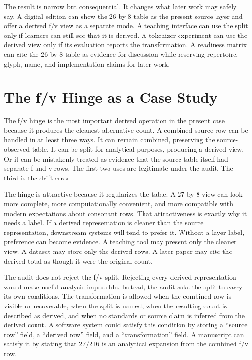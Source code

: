 \documentclass[sigconf,nonacm]{acmart}
\begin{document}
The result is narrow but consequential. It changes what later work may safely
say. A digital edition can show the 26 by 8 table as the present source layer
and offer a derived f/v view as a separate mode. A teaching interface can use
the split only if learners can still see that it is derived. A tokenizer
experiment can use the derived view only if its evaluation reports the
transformation. A readiness matrix can cite the 26 by 8 table as evidence for
discussion while reserving repertoire, glyph, name, and implementation claims
for later work.

\section{The f/v Hinge as a Case Study}
The f/v hinge is the most important derived operation in the present case
because it produces the cleanest alternative count. A combined source row can
be handled in at least three ways. It can remain combined, preserving the
source-observed table. It can be split for analytical purposes, producing a
derived view. Or it can be mistakenly treated as evidence that the source table
itself had separate f and v rows. The first two uses are legitimate under the
audit. The third is the drift error.

The hinge is attractive because it regularizes the table. A 27 by 8 view can
look more complete, more computationally convenient, and more compatible with
modern expectations about consonant rows. That attractiveness is exactly why it
needs a label. If a derived representation is cleaner than the source
representation, downstream systems will tend to prefer it. Without a layer
label, preference can become evidence. A teaching tool may present only the
cleaner view. A dataset may store only the derived rows. A later paper may cite
the derived total as though it were the original count.

The audit does not reject the f/v split. Rejecting every derived representation
would make useful analysis impossible. Instead, the audit asks the split to
carry its own conditions. The transformation is allowed when the combined row is
visible or recoverable, when the split is named, when the resulting count is
described as derived, and when no standards or source claim is inferred from the
derived count. A software system could satisfy this condition by storing a
``source row'' field, a ``derived row'' field, and a ``transformation'' field.
A manuscript can satisfy it by stating that 27/216 is an analytical expansion
from the combined f/v row.
\end{document}
